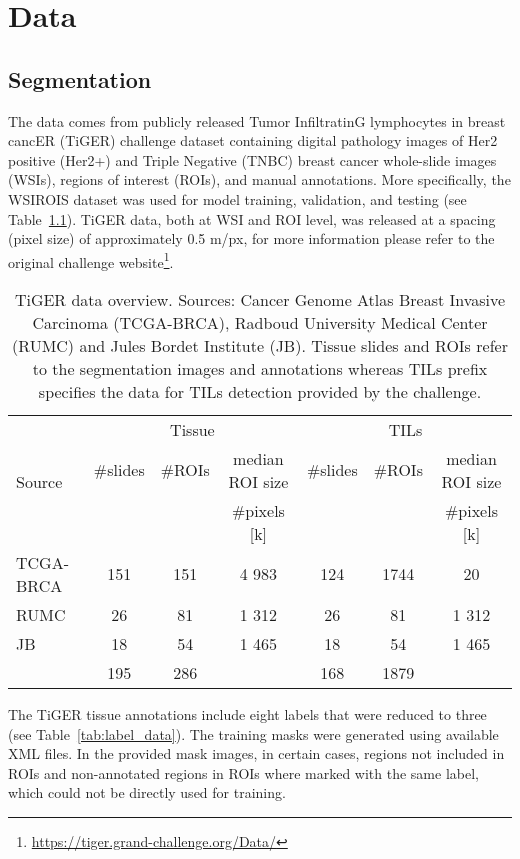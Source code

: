 \chapter{Data}
\section{Segmentation}
The data comes from publicly released Tumor InfiltratinG lymphocytes in
breast cancER (TiGER) challenge dataset containing
digital pathology images of Her2 positive (Her2+) and Triple Negative (TNBC) breast
cancer whole-slide images (WSIs), regions of interest (ROIs), and manual annotations. More specifically, the WSIROIS dataset
was used for model training, validation, and testing (see Table~\ref*{tab:segm_data}).
TiGER data, both at WSI and ROI level, was released at a spacing (pixel size) of approximately 0.5 \textmu m/px,
for more information please refer to the original challenge
website\footnote{\url{https://tiger.grand-challenge.org/Data/}}.
\begin{table}[h!]
\centering
\begin{tabular}{ l c c c c c c } 
\hline
\multirow{3}{*}{Source} &  \multicolumn{3}{c}{Tissue} & \multicolumn{3}{c}{TILs}\\ 
\cline{2-7}
 & \#slides & \#ROIs & median ROI size & \#slides & \#ROIs & median ROI size \\ 
  & & & \#pixels [k] & & & \#pixels [k] \\ 
\hline
TCGA-BRCA & 151 & 151 & 4 983 & 124 & 1744 & 20\\ 
RUMC & 26 & 81 & 1 312 & 26 & 81 & 1 312\\ 
JB & 18 & 54 & 1 465 & 18 & 54 & 1 465\\
\hline
 & 195 & 286 & & 168 & 1879 &\\
\end{tabular}
\caption{\label{tab:segm_data}TiGER data overview. Sources: Cancer Genome Atlas Breast Invasive Carcinoma (TCGA-BRCA),
Radboud University Medical Center (RUMC) and Jules Bordet Institute (JB). Tissue slides and ROIs refer to the segmentation
images and annotations whereas TILs prefix specifies the data for TILs detection provided by the challenge. }
\end{table}
The TiGER tissue annotations include eight
labels that were reduced to three (see Table~\ref*{tab:label_data}).
The training masks were generated using available XML files. In the provided mask
images, in certain cases, regions not included in ROIs and non-annotated regions in ROIs where
marked with the same label, which could not be directly used for training.
